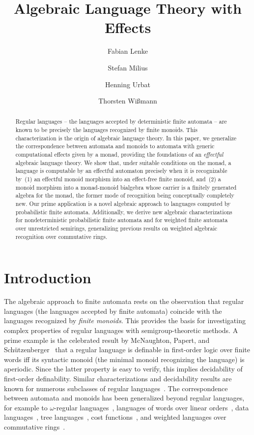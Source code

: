 \documentclass[a4paper, UKenglish, numberwithinsect, thm-restate, cleveref, final]{lipics-v2021}
\title{Algebraic Language Theory with Effects}
\author{Fabian Lenke}{Friedrich-Alexander-Universität Erlangen-Nürnberg, Germany\and\url{https://www8.cs.fau.de/people/henning-urbat/}}{henning.urbat@fau.de}{https://orcid.org/0000-0001-5890-9485}{}
\author{Stefan Milius}{Friedrich-Alexander-Universität Erlangen-Nürnberg, Germany\and\url{https://www.stefan-milius.eu}}{henning.urbat@fau.de}{https://orcid.org/0000-0002-2021-1644}{}
\author{Henning Urbat}{Friedrich-Alexander-Universität Erlangen-Nürnberg, Germany\and\url{https://www8.cs.fau.de/people/henning-urbat/}}{henning.urbat@fau.de}{https://orcid.org/0000-0002-3265-7168}{}
\author{Thorsten Wißmann}{Friedrich-Alexander-Universität Erlangen-Nürnberg, Germany\and\url{https://thorsten-wissmann.de}}{thorsten.wissmann@fau.de}{https://orcid.org/0000-0001-8993-6486}{}
\theoremstyle{plain}
\theoremstyle{definition}
\numberwithin{equation}{section}
\begin{document}
\maketitle
\begin{abstract}
  Regular languages -- the languages accepted by deterministic finite automata -- are known to be precisely the languages recognized by finite monoids. This characterization is the origin of algebraic language theory. In this paper, we generalize the correspondence between automata and monoids to automata with generic computational effects given by a monad, providing the foundations of an \emph{effectful} algebraic language theory. We show that, under suitable conditions on the monad, a language is computable by an effectful automaton precisely when it is recognizable by~(1) an effectful monoid morphism into an effect-free finite monoid,
and~(2) a monoid morphism into a monad-monoid bialgebra whose carrier is a finitely generated algebra for the monad, the former mode of recognition being conceptually completely new. Our prime application is a novel algebraic approach to languages computed by probabilistic finite automata. Additionally, we derive new algebraic characterizations for nondeterministic probabilistic finite automata and for weighted finite automata over unrestricted semirings, generalizing previous results on weighted algebraic recognition over commutative rings.
\end{abstract}

\section{Introduction}

The algebraic approach to finite automata rests on the observation that regular languages (the languages accepted by finite automata) coincide with the languages recognized by \emph{finite monoids}. This provides the basis for investigating complex properties of regular languages with semigroup-theoretic methods. A prime example is the celebrated result by McNaughton, Papert, and Schützenberger~\cite{sch65,mp71} that a regular language is definable in first-order logic over finite words iff its syntactic monoid (the minimal monoid recognizing the language) is aperiodic. Since the latter property is easy to verify, this implies decidability of first-order definability. Similar characterizations and decidability results are known for numerous subclasses of regular languages~\cite{pin86,dgk08,pin15}. The correspondence between automata and monoids has been generalized beyond regular languages, for example to $\omega$-regular languages~\cite{wilke91,pp04}, languages of words over linear orders~\cite{Bedon2005}, data languages~\cite{bs20}, tree languages~\cite{almeida90,SalehiSteinby07,bw08,blumensath20}, cost functions~\cite{colcombet09}, and weighted languages over commutative rings~\cite{reu80}.
\end{document}
